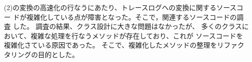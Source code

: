 \documentclass[final,12pt,report]{jsbook}
\begin{document}





(2)の変換の高速化の行なうにあたり、トレースログへの変換に関するソースコー
ドが複雑化している点が障害となった。そこで，関連するソースコードの調査
した。
調査の結果、クラス設計に大きな問題はなかったが、
多くのクラスにおいて、複雑な処理を行なうメソッドが存在しており、これが
ソースコードを複雑化さている原因であった。
そこで、複雑化したメソッドの整理をリファクタリングの目的とした。

\newpage

\maketitle
\pagestyle{plain} 
\setcounter{page}{1}
\setcounter{tocdepth}{2}
\tableofcontents

\clearpage
\pagestyle{plain} 
\setcounter{page}{1}
\end{document}
